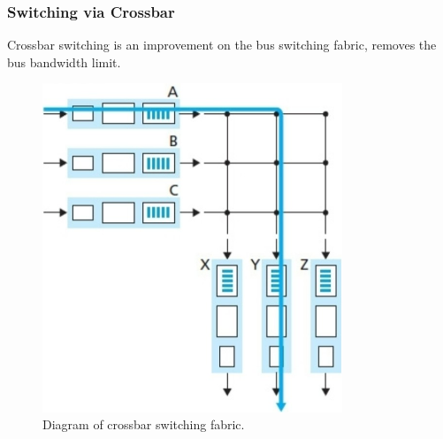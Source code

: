 \documentclass[12pt]{article}
\begin{document}
	\subsubsection{Switching via Crossbar}
	Crossbar switching is an improvement on the bus switching fabric, removes the bus bandwidth limit.
	\begin{figure}[ht!]
		\centering
		\includegraphics[width=0.8\textwidth]{cross_swt}
		\caption{Diagram of crossbar switching fabric.}
		\label{fig:cross_swt}
	\end{figure}
\end{document}
